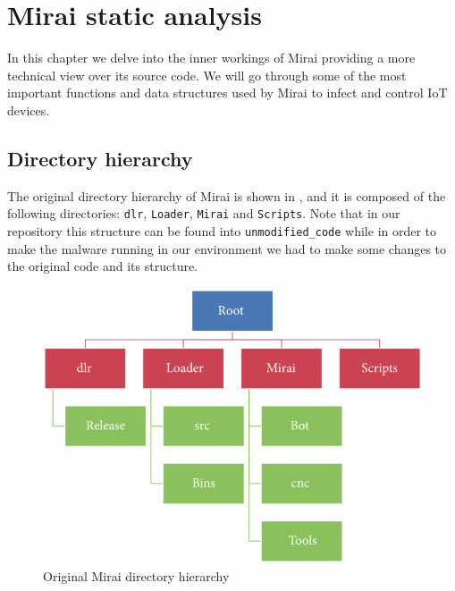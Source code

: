 \chapter{Mirai static analysis}
\label{chapter:mirai-static-analysis}

In this chapter we delve into the inner workings of Mirai providing a more technical view over its source code. We will go through some of the most important functions and data structures used by Mirai to infect and control IoT devices.

\section{Directory hierarchy}

The original directory hierarchy of Mirai is shown in , and it is composed of the following directories: \texttt{dlr}, \texttt{Loader}, \texttt{Mirai} and \texttt{Scripts}. Note that in our repository this structure can be found into \texttt{unmodified\_code} while in order to make the malware running in our environment we had to make some changes to the original code and its structure. 

\begin{figure}[ht]
    \centering
    \includegraphics[scale=0.3]{resources/images/folder-structure.png}
    \caption{Original Mirai directory hierarchy \cite{de2018ddos}}
    \label{fig:folder-hierarchy}
\end{figure}

